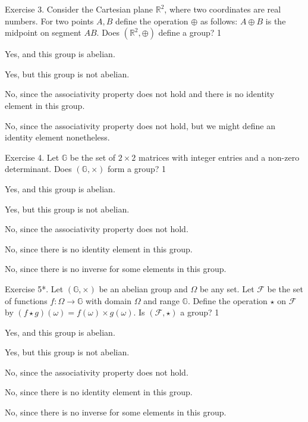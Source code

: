 \documentclass[../../book.tex]{subfiles}
\begin{document}
\begin{xexercise}
    {Exercise 3.}
    {Consider the Cartesian plane $\mathbb{R}^2$, where two coordinates are real numbers. For two points $A,B$ 
    define the operation $\oplus$ as follows: $A \oplus B$ is the midpoint on segment $AB$. Does 
    $(\mathbb{R}^2, \oplus)$ define a group?}
    {1}
    {
        \item Yes, and this group is abelian.
        \item Yes, but this group is not abelian.
        \item No, since the associativity property does not hold and there is no identity element in this group.
        \item No, since the associativity property does not hold, but we might define an identity element nonetheless.
    }
\end{xexercise}

\begin{xexercise}
    {Exercise 4.} {Let $\mathbb{G}$ be the set of $2\times 2$ matrices with integer 
    entries and a non-zero determinant. Does $(\mathbb{G},\times)$ form a group?} {1} {
        \item Yes, and this group is abelian.
        \item Yes, but this group is not abelian.
        \item No, since the associativity property does not hold.
        \item No, since there is no identity element in this group.
        \item No, since there is no inverse for some elements in this group.
    }
\end{xexercise}

\begin{xexercise}
    {Exercise 5*.} {Let $(\mathbb{G},\times)$ be an abelian group and $\Omega$
    be any set. Let $\mathcal{F}$ be the set of functions $f: \Omega \to
    \mathbb{G}$ with domain $\Omega$ and range $\mathbb{G}$. Define the
    operation $\star$ on $\mathcal{F}$ by $(f \star g)(\omega) = f(\omega)\times
    g(\omega)$. Is $(\mathcal{F}, \star)$ a group?} {1} {
        \item Yes, and this group is abelian.
        \item Yes, but this group is not abelian.
        \item No, since the associativity property does not hold.
        \item No, since there is no identity element in this group.
        \item No, since there is no inverse for some elements in this group.
    }
\end{xexercise}
\end{document}
